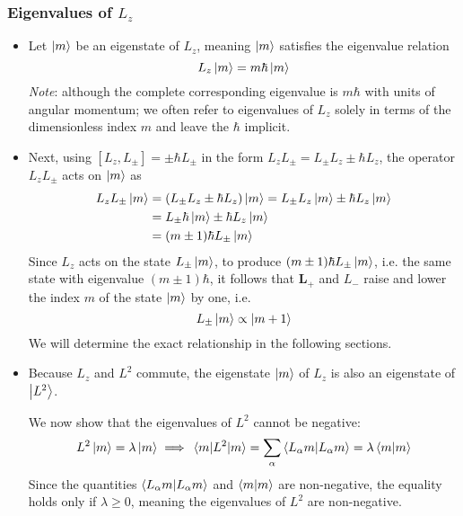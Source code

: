 \documentclass[11pt, a4paper]{article}
\renewcommand{\vec}[1]{\bm{#1}}  %
\renewcommand{\L}{\vec{L}}  %
\begin{document}
\subsubsection{Eigenvalues of $ L_{z} $}
\begin{itemize}
	
	\item Let $ \ket{m} $ be an eigenstate of $ L_{z} $, meaning $ \ket{m} $ satisfies the eigenvalue relation
	\begin{equation*}
		L_{z}\ket{m} = m \hbar \ket{m}
	\end{equation*}
	\textit{Note}: although the complete corresponding eigenvalue is $ m\hbar $ with units of angular momentum; we often refer to eigenvalues of $ L_{z} $ solely in terms of the dimensionless index $ m $ and leave the $ \hbar $ implicit.
	
	\item Next, using $ [L_{z}, L_{\pm}] = \pm \hbar L_{\pm} $ in the form $ L_{z}L_{\pm} = L_{\pm}L_{z} \pm \hbar L_{z} $, the operator $ L_{z}L_{\pm} $ acts on $ \ket{m} $ as
	\begin{align*}
		L_{z}L_{\pm} \ket{m} &= (L_{\pm}L_{z} \pm \hbar L_{z})\ket{m} = L_{\pm} L_{z}\ket{m} \pm \hbar L_{z}\ket{m}\\
		& = L_{\pm} \hbar \ket{m} \pm \hbar L_{z}\ket{m}\\
		& = (m \pm 1)\hbar L_{\pm}\ket{m}
	\end{align*}
	Since $ L_{z} $ acts on the state $ L_{\pm}\ket{m} $,  to produce $ (m \pm 1)\hbar L_{\pm}\ket{m} $, i.e. the same state with eigenvalue $ (m \pm 1)\hbar $, it follows that $ \L_{+} $ and $ L_{-} $ raise and lower the index $ m $ of the state $ \ket{m} $ by one, i.e. 
	\begin{equation*}
		L_{\pm} \ket{m} \propto \ket{m+1}
	\end{equation*}
	We will determine the exact relationship in the following sections.
	
	\item Because $ L_{z} $ and $ L^{2} $ commute, the eigenstate $ \ket{m} $ of $ L_{z} $ is also an eigenstate of $ \ket{L^{2}} $. 
	
	We now show that the eigenvalues of $ L^{2} $ cannot be negative:
	\begin{equation*}
		L^{2}\ket{m} = \lambda \ket{m} \implies \mel{m}{L^{2}}{m} = \sum_{\alpha} \braket{L_{\alpha}m}{L_{\alpha}m} = \lambda \braket{m}{m}
	\end{equation*}
	Since the quantities $ \braket{L_{\alpha}m}{L_{\alpha}m} $ and $ \braket{m}{m} $ are non-negative, the equality holds only if $ \lambda \geq 0 $, meaning the eigenvalues of $ L^{2} $ are non-negative.
	

\end{itemize}
\end{document}
